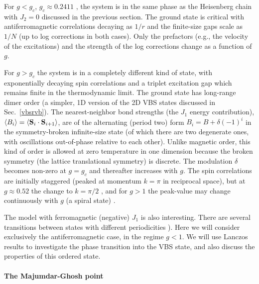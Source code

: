 \documentclass[draft,numberedheadings]{aipproc}
\begin{document}
For $g < g_c$, $g_c \approx 0.2411$ \cite{nomura92}, the system is in the same phase as the Heisenberg chain with $J_2=0$ discussed in the previous section. 
The ground state is critical with antiferromagnetic correlations decaying as $1/r$ and the finite-size gaps scale as $1/N$ (up to log corrections in both 
cases). Only the prefactors (e.g., the velocity of the  excitations) and the strength of the log corrections change as a function of $g$. 

For $g>g_c$ the system is in a completely different kind of state, with exponentially decaying spin correlations and a triplet excitation gap which remains 
finite in the thermodynamic limit. The ground state has long-range dimer order (a simpler, 1D version of the 2D VBS states discussed in Sec.~\ref{vbsrvb}). 
The nearest-neighbor bond strengths (the $J_1$ energy 
contribution), $\langle B_i\rangle =\langle {\bf S}_i \cdot {\bf S}_{i+1} \rangle$, are of the alternating (period two) form $B_i = B +\delta(-1)^i$ in the 
symmetry-broken infinite-size state (of which there are two degenerate ones, with oscillations out-of-phase relative to each other). Unlike magnetic order, 
this kind of order is allowed at zero temperature in one dimension because the broken symmetry (the lattice translational symmetry) is discrete. The modulation 
$\delta$ becomes non-zero at $g=g_c$ and thereafter increases with $g$. The spin correlations are initially staggered (peaked at momentum $k=\pi$ in reciprocal 
space), but at $g\approx 0.52$ the change to $k=\pi/2$ \cite{bursill96}, and for $g>1$ the peak-value may change continuously with $g$ (a spiral state)
\cite{kumar}.

The model with ferromagnetic (negative) $J_1$ is also interesting. There are several transitions between states with different periodicities \cite{momoi}).
Here we will consider exclusively the antiferromagnetic case, in the regime $g<1$. We will use Lanczos results to investigate the phase transition into the 
VBS state, and also discuss the properties of this ordered state. 

\paragraph{The Majumdar-Ghosh point}
\end{document}
